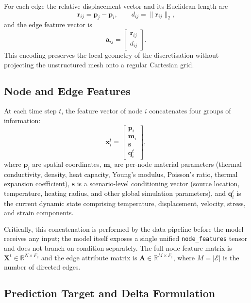 For each edge the relative displacement vector and its Euclidean length are
\[
  \mathbf{r}_{ij} = \mathbf{p}_j - \mathbf{p}_i,
  \qquad
  d_{ij} = \|\mathbf{r}_{ij}\|_2,
\]
and the edge feature vector is
\[
  \mathbf{a}_{ij}
  =
  \begin{bmatrix}
    \mathbf{r}_{ij} \\ d_{ij}
  \end{bmatrix}.
\]
This encoding preserves the local geometry of the discretisation without
projecting the unstructured mesh onto a regular Cartesian grid.

\subsection{Node and Edge Features}

At each time step \(t\), the feature vector of node \(i\) concatenates four
groups of information:
\[
  \mathbf{x}_i^t
  =
  \begin{bmatrix}
    \mathbf{p}_i \\[2pt]
    \mathbf{m}_i \\[2pt]
    \mathbf{s}   \\[2pt]
    \mathbf{q}_i^t
  \end{bmatrix},
\]
where \(\mathbf{p}_i\) are spatial coordinates, \(\mathbf{m}_i\) are
per-node material parameters (thermal conductivity, density, heat capacity,
Young's modulus, Poisson's ratio, thermal expansion coefficient),
\(\mathbf{s}\) is a scenario-level conditioning vector (source location,
temperature, heating radius, and other global simulation parameters),
and \(\mathbf{q}_i^t\) is the current dynamic state comprising temperature,
displacement, velocity, stress, and strain components.

Critically, this concatenation is performed by the data pipeline before the
model receives any input; the model itself exposes a single unified
\texttt{node\_features} tensor and does not branch on condition separately.
The full node feature matrix is
\(\mathbf{X}^{t}\in\mathbb{R}^{N\times F_{v}}\)
and the edge attribute matrix is
\(\mathbf{A}\in\mathbb{R}^{M\times F_{e}}\),
where \(M=|\mathcal{E}|\) is the number of directed edges.

\subsection{Prediction Target and Delta Formulation}

